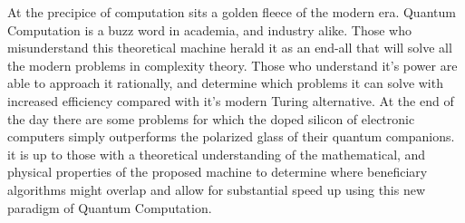 At the precipice of computation sits a golden fleece of the modern era. Quantum Computation is a buzz word in academia, and industry alike. Those who misunderstand this theoretical machine 
herald it as an end-all that will solve all the modern problems in complexity theory. Those who understand it's power are able to approach it rationally, and determine which problems it 
can solve with increased efficiency compared with it's modern Turing alternative. At the end of the day there are some problems for which the doped silicon of electronic computers simply outperforms the polarized glass of their quantum companions. it is up to those with a theoretical understanding of the mathematical, and physical properties of the proposed machine to determine where beneficiary algorithms might overlap and allow for substantial speed up using this new paradigm of Quantum Computation.

